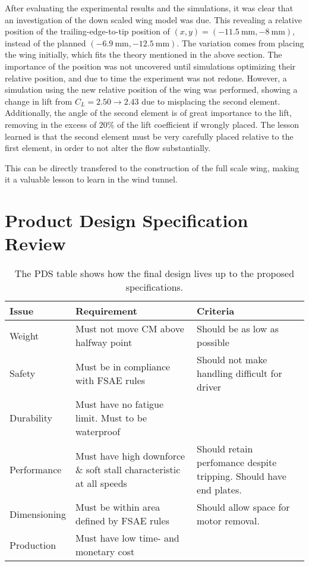   After evaluating the experimental results and the simulations, it was clear that an investigation of the down scaled wing model was due. This revealing a relative position of the trailing-edge-to-tip position of $(x,y) = (\SI{-11.5}{\milli\metre},\SI{-8}{\milli\metre})$, instead of the planned $(\SI{-6.9}{\milli\metre},\SI{-12.5}{\milli\metre})$. The variation comes from placing the wing initially, which fits the theory mentioned in the above section. The importance of the position was not uncovered until simulations optimizing their relative position, and due to time the experiment was not redone. However, a simulation using the new relative position of the wing was performed, showing a change in lift from $ C_L = 2.50 \rightarrow 2.43$ due to misplacing the second element. Additionally, the angle of the second element is of great importance to the lift, removing in the excess of $20\%$ of the lift coefficient if wrongly placed. The lesson learned is that the second element must be very carefully placed relative to the first element, in order to not alter the flow substantially.

  This can be directly transfered to the construction of the full scale wing, making it a valuable lesson to learn in the wind tunnel.

\section{Product Design Specification Review}

  \begin{table}
    \begin{tabularx}{\textwidth}[t]{>{\columncolor{seapurple!40}}l XX}
      \arrayrulecolor{seapurple}\hline
      \rowcolor{white}
      \textbf{\textcolor{seapurple}{Issue}} & \textbf{\textcolor{seapurple}{Requirement}} & \textbf{\textcolor{seapurple}{Criteria}}\\
      \hline
      Weight & \cellcolor{seagreen!40}Must not move CM above halfway point & \cellcolor{seagreen!40}Should be as low as possible \\
      Safety & \cellcolor{seagreen!40}Must be in compliance with FSAE rules & \cellcolor{seagreen!40}Should not make handling difficult for driver\\
      Durability & \cellcolor{seagreen!40} Must have no fatigue limit. Must to be waterproof \\
      Performance & \cellcolor{seagreen!40} Must have high downforce \& soft stall characteristic at all speeds &\cellcolor{seagreen!40} Should retain perfomance despite tripping. Should have end plates.\\
      Dimensioning & \cellcolor{seagreen!40} Must be within area defined by FSAE rules & \cellcolor{seayellow!40} Should allow space for motor removal. \\
      Production & \cellcolor{seagreen!40} Must have low time- and monetary cost
    \end{tabularx}
    \caption{The PDS table shows how the final design lives up to the proposed specifications.}
    \label{tab:designreview}
  \end{table}

